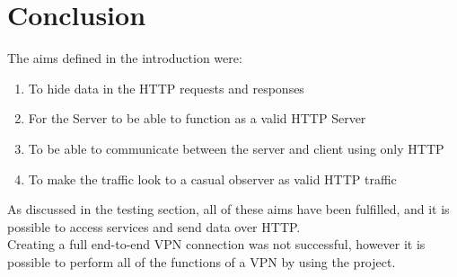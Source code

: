 \section{Conclusion}
The aims defined in the introduction were:
\begin{enumerate}
    \item To hide data in the HTTP requests and responses
    \item For the Server to be able to function as a valid HTTP Server
    \item To be able to communicate between the server and client using only HTTP
    \item To make the traffic look to a casual observer as valid HTTP traffic
\end{enumerate}
As discussed in the testing section, all of these aims have been fulfilled, and it is possible to access services and send data over HTTP.\\
Creating a full end-to-end VPN connection was not successful, however it is possible to perform all of the functions of a VPN by using the project.
